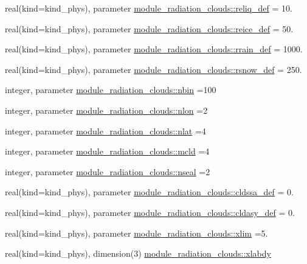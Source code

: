 \begin{DoxyCompactItemize}
\item 
real(kind=kind\+\_\+phys), parameter \hyperlink{namespacemodule__radiation__clouds_a1768a85f4d8af2ad40b62ae6e6667c1e}{module\+\_\+radiation\+\_\+clouds\+::reliq\+\_\+def} = 10.
\item 
real(kind=kind\+\_\+phys), parameter \hyperlink{namespacemodule__radiation__clouds_a721e0fb4a34774f5b61f567b9cad8e7b}{module\+\_\+radiation\+\_\+clouds\+::reice\+\_\+def} = 50.
\item 
real(kind=kind\+\_\+phys), parameter \hyperlink{namespacemodule__radiation__clouds_a93fcaedae02c0f9c4de9f39061379d6b}{module\+\_\+radiation\+\_\+clouds\+::rrain\+\_\+def} = 1000.
\item 
real(kind=kind\+\_\+phys), parameter \hyperlink{namespacemodule__radiation__clouds_a2b68c4a206e17cb59597f6c4dffc7c1a}{module\+\_\+radiation\+\_\+clouds\+::rsnow\+\_\+def} = 250.
\item 
integer, parameter \hyperlink{namespacemodule__radiation__clouds_ad2947b3c0a8382fbe12b76dd68b290e0}{module\+\_\+radiation\+\_\+clouds\+::nbin} =100
\item 
integer, parameter \hyperlink{namespacemodule__radiation__clouds_ab4d14edea12bbcda5361cad523386c7c}{module\+\_\+radiation\+\_\+clouds\+::nlon} =2
\item 
integer, parameter \hyperlink{namespacemodule__radiation__clouds_ad4274cb223949e858ecc2e6346bed610}{module\+\_\+radiation\+\_\+clouds\+::nlat} =4
\item 
integer, parameter \hyperlink{namespacemodule__radiation__clouds_afb94f3d62afa49bef6c33f73a7ecad65}{module\+\_\+radiation\+\_\+clouds\+::mcld} =4
\item 
integer, parameter \hyperlink{namespacemodule__radiation__clouds_aaf2a6549a8c42b9eae3d40d21d1e9532}{module\+\_\+radiation\+\_\+clouds\+::nseal} =2
\item 
real(kind=kind\+\_\+phys), parameter \hyperlink{namespacemodule__radiation__clouds_a2ce850be46f0144caa09309ae01958c2}{module\+\_\+radiation\+\_\+clouds\+::cldssa\+\_\+def} = 0.
\item 
real(kind=kind\+\_\+phys), parameter \hyperlink{namespacemodule__radiation__clouds_ab94e45a81d8be82b6cb686b35fd78a80}{module\+\_\+radiation\+\_\+clouds\+::cldasy\+\_\+def} = 0.
\item 
real(kind=kind\+\_\+phys), parameter \hyperlink{namespacemodule__radiation__clouds_a1146f43b680b655d354a9c031ee4a463}{module\+\_\+radiation\+\_\+clouds\+::xlim} =5.
\item 
real(kind=kind\+\_\+phys), dimension(3) \hyperlink{namespacemodule__radiation__clouds_ab2a798da0bb0125d1d5074b73c5951dc}{module\+\_\+radiation\+\_\+clouds\+::xlabdy}

\end{DoxyCompactItemize}
